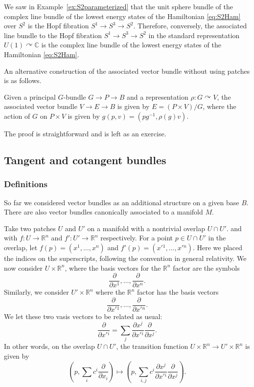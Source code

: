 \documentclass[12pt]{article}
\numberwithin{equation}{section}
\theoremstyle{remark}
\def\bC{\mathbb{C}}
\def\bR{\mathbb{R}}
\begin{document}
We saw in Example~\ref{ex:S2parameterized} that the unit sphere bundle
of the complex line bundle of the lowest energy states of the Hamiltonian \eqref{eq:S2Ham}
over $S^2$ is the Hopf fibration $S^1\to S^3\to S^2$.
Therefore, conversely, the associated line bundle
to the Hopf fibration $S^1\to S^3\to S^2$ 
in the standard representation $U(1)\curvearrowright \bC$
is the complex line bundle of the lowest energy states of the Hamiltonian \eqref{eq:S2Ham}.

An alternative construction of the associated vector bundle 
without using patches is as follows. 
\begin{proposition}
  Given a principal $G$-bundle $G\to P\to B$ and a representation $\rho: G\curvearrowright V$,
  the associated vector bundle $V\to E\to B$ is given by
  $E= (P \times V)/G$,
  where the action of $G$ on $P\times V$ is given by $g(p,v)=(pg^{-1},\rho(g)v)$.
\end{proposition}
The proof is straightforward and is left as an exercise.

\subsection{Tangent and cotangent bundles}

\subsubsection{Definitions}
So far we considered vector bundles as an additional structure on a given base $B$.
There are also vector bundles canonically associated to a manifold $M$.

Take two patches $U$ and $U'$ on a manifold
with a nontrivial overlap $U\cap U'$.
and with $f:U\to \bR^n$ and $f':U'\to \bR^n$ respectively.
For a point $p\in U\cap U'$ in the overlap,
let $f(p)=(x^1,\ldots,x^n)$ and $f'(p)=(x'{}^1,\ldots,x'{}^n)$.
Here we placed the indices on the superscripts, following the convention in general relativity.
We now consider $U\times \bR^n$,
where the basis vectors for the $\bR^n$ factor
are the symbols
\begin{equation}
\frac{\partial}{\partial x^1},\ldots,\frac{\partial}{\partial x^n}.
\end{equation}
Similarly, we consider $U'\times \bR^n$
where the $\bR^n$ factor has the basis vectors
\begin{equation}
\frac{\partial}{\partial x'{}^1},\ldots,\frac{\partial}{\partial x'{}^n}.
\end{equation}
We let these two vasis vectors to be related as usual:
\begin{equation}
\frac{\partial}{\partial x'{}^i} = \sum_{j}\frac{\partial x^j}{\partial x'{}^i} \frac{\partial}{\partial x^j}.
\label{eq:contravariant}
\end{equation}
In other words, on the overlap $U\cap U'$,
the transition function $U\times \bR^n \to U'\times \bR^n$ is given by 
\begin{equation}
  (p,\sum_i c^i\frac{\partial}{\partial x_i} )
  \mapsto 
  (p, \sum_{i,j} c^i \frac{\partial x^j}{\partial x'{}^i} \frac{\partial}{\partial x^j}).
\end{equation}
\end{document}
